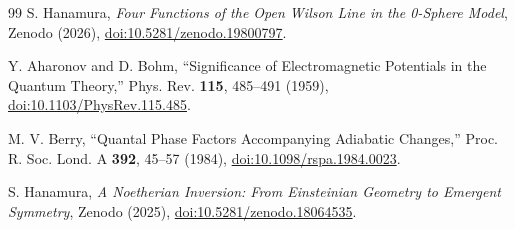 \documentclass[%
 reprint, amsmath,amssymb, aps, prb, ]{revtex4-2}
\numberwithin{equation}{section}
\begin{document}
\begin{thebibliography}{99}
S. Hanamura, \emph{Four Functions of the Open Wilson Line in the 0-Sphere Model}, Zenodo (2026), \href{https://doi.org/10.5281/zenodo.19800797}{doi:10.5281/zenodo.19800797}.

Y. Aharonov and D. Bohm, ``Significance of Electromagnetic Potentials in the Quantum Theory,'' Phys. Rev. \textbf{115}, 485--491 (1959), \href{https://doi.org/10.1103/PhysRev.115.485}{doi:10.1103/PhysRev.115.485}.

M. V. Berry, ``Quantal Phase Factors Accompanying Adiabatic Changes,'' Proc. R. Soc. Lond. A \textbf{392}, 45--57 (1984), \href{https://doi.org/10.1098/rspa.1984.0023}{doi:10.1098/rspa.1984.0023}.

S. Hanamura, \emph{A Noetherian Inversion: From Einsteinian Geometry to Emergent Symmetry}, Zenodo (2025), \href{https://doi.org/10.5281/zenodo.18064535}{doi:10.5281/zenodo.18064535}.

\end{thebibliography}
\end{document}
